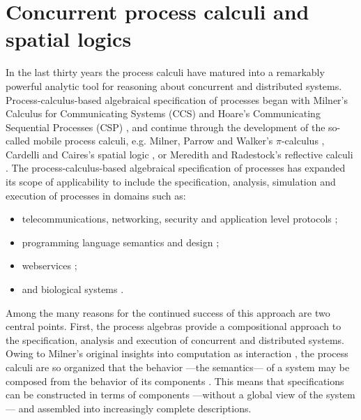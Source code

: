\section{Concurrent process calculi and spatial logics }\label{sec:concurrent_process_calculi_and_spatial_logics_} %
In the last thirty years the process calculi have matured into a
remarkably powerful analytic tool for reasoning about concurrent and
distributed systems. Process-calculus-based algebraical specification of
processes began with Milner's Calculus for Communicating Systems (CCS)
\cite{MilnerCCS80} and Hoare's Communicating Sequential Processes
(CSP) \cite{CSP} \cite{CSP1} \cite{CSP2} \cite{CSP3}, and continue
through the development of the so-called mobile process calculi,
e.g. Milner, Parrow and Walker's $\pi$-calculus \cite{ParrowWalker},
Cardelli and Caires's spatial logic \cite{CairesC04} \cite{CairesC03}
\cite{Caires04}, or Meredith and Radestock's reflective calculi
\cite{MeredithR05} \cite{meredith2005rho}. The process-calculus-based
algebraical specification of processes has expanded its scope of
applicability to include the specification, analysis, simulation and
execution of processes in domains such as:

\begin{itemize}
\item telecommunications, networking, security and application level protocols
\cite{AbadiB02} 
\cite{AbadiB03} 
\cite{BrownLM05} 
\cite{LaneveZ05}; 
\item programming language semantics and design
\cite{BrownLM05}
\cite{djoin}
\cite{JoCaml}
\cite{WojciechowskiS99};
\item webservices
\cite{BrownLM05}
\cite{LaneveZ05}
\cite{MeredithB03};
\item and biological systems
\cite{Cardelli04}
\cite{DanosL03}
\cite{RegevS03}
\cite{PriamiRSS01}.
\end{itemize}

Among the many reasons for the continued success of this approach are
two central points. First, the process algebras provide a
compositional approach to the specification, analysis and execution of
concurrent and distributed systems. Owing to Milner's original
insights into computation as interaction \cite{Milner93}, the process
calculi are so organized that the behavior ---the semantics--- of a
system may be composed from the behavior of its components
\cite{Fokkink}. This means that specifications can be constructed in
terms of components ---without a global view of the system--- and
assembled into increasingly complete descriptions.

